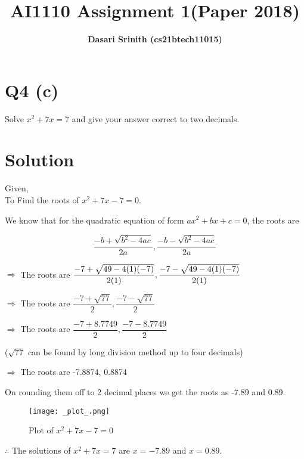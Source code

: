 \documentclass[12pt,letterpaper,twocolumn]{article}
\title{\textbf{AI1110 Assignment 1(Paper 2018)}}
\author{\textbf{Dasari Srinith (cs21btech11015)}}
\date{}
\begin{document}
\maketitle

\section*{Q4 (c)}
    Solve $x^2 + 7x = 7$ and give your answer correct to two decimals.
\vspace{-0.5cm}
\section*{Solution}

    Given,\\
    To Find the roots of $x^2 +7x -7 = 0$.
    
    We know that for the quadratic equation of form $ax^2 + bx +c = 0$,
    the roots are
    
    $$\dfrac{-b+\sqrt{b^2 -4ac}}{2a},\dfrac{-b-\sqrt{b^2 -4ac}}{2a}$$
    
    $\Rightarrow$ The roots are $\dfrac{-7+\sqrt{49 -4(1)(-7)}}{2(1)}
                       ,\\\dfrac{-7-\sqrt{49 -4(1)(-7)}}{2(1)}$
                       
    $\Rightarrow$ The roots are $\dfrac{-7+\sqrt{77}}{2}
                       ,\dfrac{-7-\sqrt{77}}{2}$
                       
    $\Rightarrow$ The roots are $\dfrac{-7+8.7749}{2}
                       ,\dfrac{-7-8.7749}{2}$
                       
    ($\sqrt{77}$ can be found by long division method up to four decimals)
    
    $\Rightarrow$ The roots are -7.8874, 0.8874
    
    On rounding them off to 2 decimal places we get the roots as -7.89 and 0.89.
    
    \begin{figure}[H]
        \centering
        \texttt{[image: \_plot\_.png]}
        \caption{Plot of $x^2 + 7x - 7 =0 $}
    \end{figure}
 
    $\therefore$ The solutions of $x^2 + 7x = 7$ are  $x = -7.89$ and $x = 0.89$.
    
\end{document}
